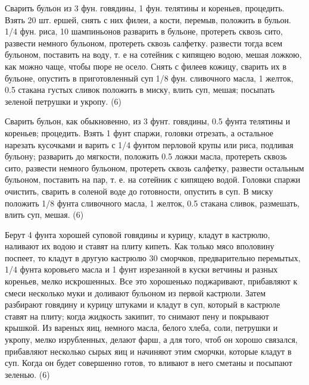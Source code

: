
Сварить бульон из 3 фун. говядины, 1 фун. телятины и кореньев, процедить. Взять 20 шт. ершей, снять с них филеи, а кости, перемыв, положить в бульон. 1/4 фун. риса, 10 шампиньонов разварить в бульоне, протереть сквозь сито, развести немного бульоном, протереть сквозь салфетку. развести тогда всем бульоном, поставить на воду, т. е на сотейник с кипящею водою, мешая ложкою, как можно чаще, чтобы пюре не осело. Снять с филеев кожицу, сварить их в бульоне, опустить в приготовленный суп 1/8 фун. сливочного масла, 1 желток, 0.5 стакана густых сливок положить в миску, влить суп, мешая; посыпать зеленой петрушки и укропу. (6)


Сварить бульон, как обыкновенно, из 3 фунт. говядины, 0.5 фунта телятины и кореньев; процедить. Взять 1 фунт спаржи, головки отрезать, а остальное нарезать кусочками и варить с 1/4 фунтом перловой крупы или риса, подливая бульону; разварить до мягкости, положить 0.5 ложки масла, протереть сквозь сито, развести немного бульоном, протереть сквозь салфетку, развести остальным бульоном, поставить на пар, т. е. на сотейник с кипящею водой. Головки спаржи очистить, сварить в соленой воде до готовности, опустить в суп. В миску положить 1/8 фунта сливочного масла, 1 желток, 0.5 стакана сливок, размешать, влить суп, мешая. (6)


Берут 4 фунта хорошей суповой говядины и курицу, кладут в кастрюлю, наливают их водою и ставят на плиту кипеть. Как только мясо вполовину поспеет, то кладут в другую кастрюлю 30 сморчков, предварительно перемытых, 1/4 фунта коровьего масла и 1 фунт изрезанной в куски ветчины и разных кореньев, мелко искрошенных. Все это хорошенько поджаривают, прибавляют к смеси несколько муки и доливают бульоном из первой кастрюли. Затем разбирают говядину и курицу штуками и кладут в суп, который в кастрюле ставят на плиту; когда жидкость закипит, то снимают пену и покрывают крышкой. Из вареных яиц, немного масла, белого хлеба, соли, петрушки и укропу, мелко изрубленных, делают фарш, а для того, чтоб он хорошо связался, прибавляют несколько сырых яиц и начиняют этим сморчки, которые кладут в суп. Когда он будет совершенно готов, то вливают в него сметаны и посыпают зеленью. (6)


